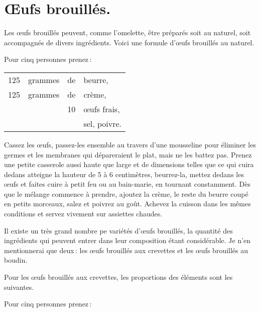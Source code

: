 \section*{\centering Œufs brouillés.}

Les œufs brouillés peuvent, comme l'omelette, être préparés soit au naturel,
soit accompagnés de divers ingrédients. Voici une formule d'œufs brouillés au
naturel.

Pour cinq personnes prenez :

\medskip

\footnotesize
\begin{longtable}{rrrp{16em}}
  125  & grammes & de & beurre,                                                                          \\
  125  & grammes & de & crème,                                                                           \\
       &         & 10 & œufs frais,                                                                      \\
       &         &    & sel, poivre.                                                                     \\
\end{longtable}
\normalsize

Cassez les œufs, passez-les ensemble au travers d’une mousseline pour éliminer
les germes et les membranes qui dépareraient le plat, mais ne les battez pas.
Prenez une petite casserole aussi haute que large et de dimensions telles que
ce qui cuira dedans atteigne la hauteur de 5 à 6 centimètres, beurrez-la,
mettez dedans les œufs et faites cuire à petit feu ou au bain-marie, en
tournant constamment. Dès que le mélange commence à prendre, ajoutez la crème,
le reste du beurre coupé en petits morceaux, salez et poivrez au goût. Achevez
la cuisson dans les mêmes conditions et servez vivement sur assiettes chaudes.

\sk

Il existe un très grand nombre pe variétés d'œufs brouillés, la quantité des
ingrédients qui peuvent entrer dans leur composition étant considérable. Je n'en
mentionnerai que deux : les œufs brouillés aux crevettes et les œufs brouillés au
boudin.

Pour les œufs brouillés aux crevettes, les proportions des éléments sont les
suivantes.

\medskip

Pour cinq personnes prenez :

